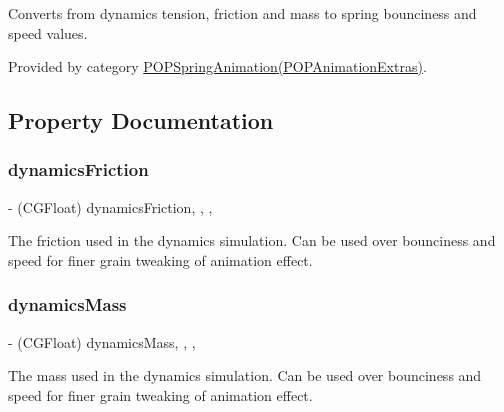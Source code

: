 Converts from dynamics tension, friction and mass to spring bounciness and speed values. 

Provided by category \mbox{\hyperlink{category_p_o_p_spring_animation_07_p_o_p_animation_extras_08_a6b5d0ffdb16b10c6de3575d9d45b831b}{P\+O\+P\+Spring\+Animation(\+P\+O\+P\+Animation\+Extras)}}.



\subsection{Property Documentation}
\mbox{\label{interface_p_o_p_spring_animation_ac7063d5cd3fb307acfa6e9e71df910df}} 
\subsubsection{\texorpdfstring{dynamics\+Friction}{dynamicsFriction}}
{\footnotesize\ttfamily -\/ (C\+G\+Float) dynamics\+Friction\hspace{0.3cm}{\ttfamily [read]}, {\ttfamily [write]}, {\ttfamily [nonatomic]}, {\ttfamily [assign]}}

The friction used in the dynamics simulation.  Can be used over bounciness and speed for finer grain tweaking of animation effect. \mbox{\label{interface_p_o_p_spring_animation_a87fc29931727e0a5b320c4690f8a56c1}} 
\subsubsection{\texorpdfstring{dynamics\+Mass}{dynamicsMass}}
{\footnotesize\ttfamily -\/ (C\+G\+Float) dynamics\+Mass\hspace{0.3cm}{\ttfamily [read]}, {\ttfamily [write]}, {\ttfamily [nonatomic]}, {\ttfamily [assign]}}

The mass used in the dynamics simulation.  Can be used over bounciness and speed for finer grain tweaking of animation effect. \mbox{\label{interface_p_o_p_spring_animation_a0cf9c83f313b13dc58a038b9f9dd18c5}} 
